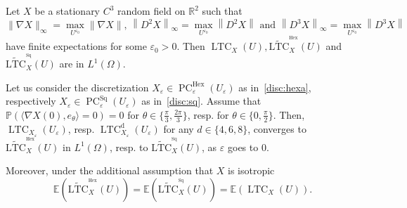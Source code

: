 \documentclass[AHL,Unicode,longabstracts,published]{cedram}
\newcommand{\R}{\mathbb{R}}
\newcommand{\bbP}{\mathbb{P}}
\newcommand{\E}{\mathbb{E}}
\newcommand{\eps}{\varepsilon}
\DeclareMathOperator{\LTC}{LTC}
\DeclareMathOperator{\PC}{PC}
\newcommand{\dd}{\mathrm{d}}
\DeclareMathOperator{\Hex}{Hex}
\DeclareMathOperator{\Sq}{Sq}
\newcommand{\tLTC}{\widetilde{\mathrm{LTC}}}
\begin{document}
\begin{prop}\label{cvgce:LTC}
Let $X$ be a stationary $C^3$ random field on $\R^2$ such that \[
\|\nabla X\|_\infty=\underset{U^{\eps_0}}{\max}\|\nabla X\|,\, \left\|D^2 X\right\|_\infty=\underset{U^{\eps_0}}{\max}\left\|D^2 X\right\|\text{ and }\left\|D^3 X\right\|_\infty=\underset{U^{\eps_0}}{\max}\left\|D^3 X\right\|
\]
have finite expectations for some $\eps_0>0$.
Then $\LTC_X(U), \tLTC^{^{\Hex}}_{X}(U)$ and $\tLTC^{^{\Sq}}_{X}(U)$ are in $L^1(\Omega)$.


Let us consider the discretization $X_\eps \in \PC_\eps^{\Hex}(U_\eps)$ as in~\eqref{disc:hexa}, respectively $X_\eps \in \PC_\eps^{\Sq}(U_\eps)$ as in~\eqref{disc:sq}. Assume that $\bbP(\langle \nabla X(0),e_\theta\rangle=0)=0$ for $\theta\in\{\tfrac{\pi}{3},\tfrac{2\pi}{3}\}$, resp. for $\theta\in\{0,\tfrac{\pi}{2}\}$. Then, $\LTC_{X_\eps}(U_\eps)$, resp. $\LTC^{\dd}_{X_\eps}(U_\eps)$ for any $d\in\{4,6,8\}$, converges to $\tLTC^{^{\Hex}}_{X}(U)$ in $L^1(\Omega)$, resp. to $\tLTC^{^{\Sq}}_{X}(U)$, as $\eps$ goes to $0$.


Moreover, under the additional assumption that $X$ is isotropic
\[
\E\left(\tLTC^{^{\Hex}}_{X}(U)\right) =\E\left(\tLTC^{^{\Sq}}_{X}(U)\right) =
\E\left(\LTC_{X}(U)\right).
\]
\end{prop}
\end{document}
